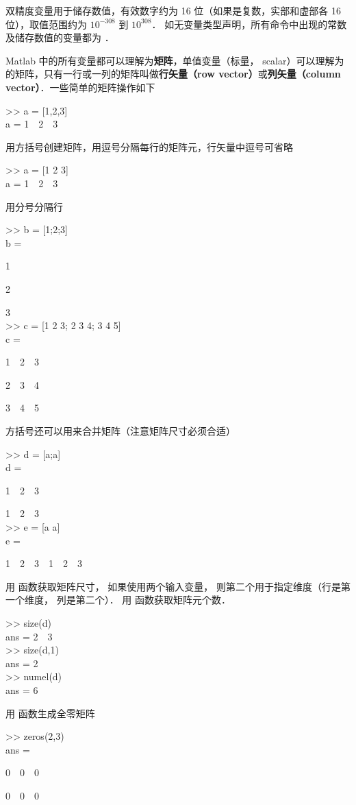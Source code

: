 双精度变量用于储存数值，有效数字约为 16 位（如果是复数，实部和虚部各 16 位），取值范围约为 $10^{-308}$ 到 $10^{308}$． 如无变量类型声明，所有命令中出现的常数及储存数值的变量都为 ．

Matlab 中的所有变量都可以理解为\textbf{矩阵}，单值变量（标量， scalar）可以理解为  的矩阵，只有一行或一列的矩阵叫做\textbf{行矢量（row vector）}或\textbf{列矢量（column vector）}．一些简单的矩阵操作如下
\begin{Command}
>> a = [1,2,3] \\
a = 1\ \ 2\ \ 3
\end{Command}
用方括号创建矩阵，用逗号分隔每行的矩阵元，行矢量中逗号可省略
\begin{Command}
>> a = [1 2 3] \\
a = 1\ \ 2\ \ 3
\end{Command}
用分号分隔行
\begin{Command}
>> b = [1;2;3] \\
b = \par
1 \par
2 \par
3 \\
>> c = [1 2 3; 2 3 4; 3 4 5]\\
c = \par
1\ \ 2\ \ 3 \par
2\ \ 3\ \ 4 \par
3\ \ 4\ \ 5
\end{Command}
方括号还可以用来合并矩阵（注意矩阵尺寸必须合适）
\begin{Command}
>> d = [a;a] \\
d = \par
1\ \ 2\ \ 3 \par
1\ \ 2\ \ 3 \\
>> e = [a a] \\
e = \par
1\ \ 2\ \ 3\ \ 1\ \ 2\ \ 3
\end{Command}
用  函数获取矩阵尺寸， 如果使用两个输入变量， 则第二个用于指定维度（行是第一个维度， 列是第二个）． 用  函数获取矩阵元个数．
\begin{Command}
>> size(d) \\
ans = 2\ \ 3 \\
>> size(d,1) \\
ans = 2 \\
>> numel(d) \\
ans = 6
\end{Command}
用  函数生成全零矩阵
\begin{Command}
>> zeros(2,3) \\
ans = \par
0\ \ 0\ \ 0 \par
0\ \ 0\ \ 0
\end{Command}
